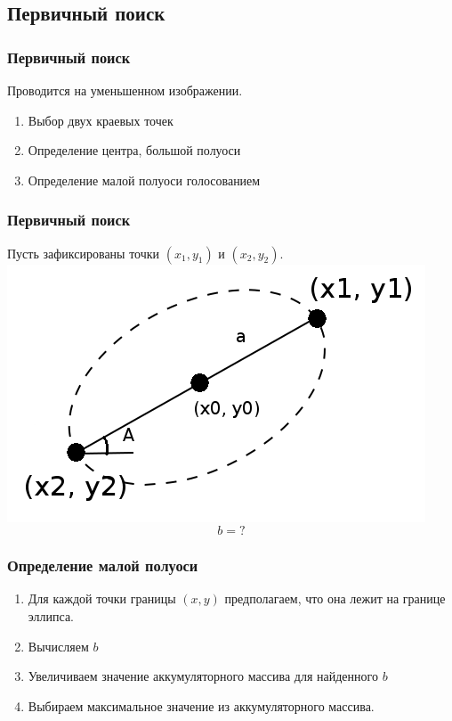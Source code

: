 \documentclass[14pt]{beamer}
\begin{document}
\subsection{Первичный поиск}
\begin{frame}
\frametitle{Первичный поиск}
Проводится на уменьшенном изображении.
\begin{block}{}
\begin{enumerate}
  \item Выбор двух краевых точек
  \item Определение центра, большой полуоси
  \item Определение малой полуоси голосованием
\end{enumerate}
\end{block}
\end{frame}

\begin{frame}
\frametitle{Первичный поиск}
Пусть зафиксированы точки $(x_1, y_1)$ и $(x_2, y_2)$.
  \center
\includegraphics[width=0.40\linewidth]{ellipse1}
$$b = ?$$
\end{frame}

\begin{frame}
\frametitle{Определение малой полуоси}
\begin{block}{}
\begin{enumerate}
  \item Для каждой точки границы $(x, y)$ предполагаем, что она лежит на границе эллипса.
  \item Вычисляем $b$
  \item Увеличиваем значение аккумуляторного массива для найденного $b$
  \item Выбираем максимальное значение из аккумуляторного массива.
\end{enumerate}
\end{block}
\end{frame}

\end{document}
